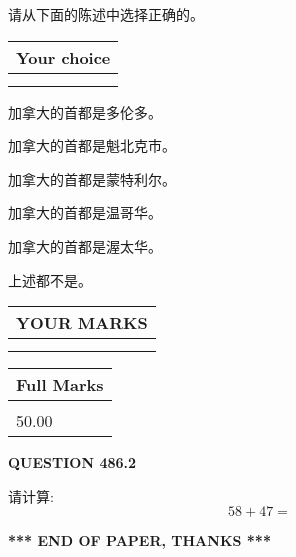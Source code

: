 \documentclass{ctexart}
\begin{document}
  
请从下面的陈述中选择正确的。
  
  
\noindent\hspace{3.0in} \begin{tabular}{|l|}
\hline
Your choice \\
\hline
 \\ 
 \\ 
\hline
\end{tabular}
  
  
 
 
加拿大的首都是多伦多。
 
 
加拿大的首都是魁北克市。
 
 
加拿大的首都是蒙特利尔。
 
 
加拿大的首都是温哥华。
 
 
加拿大的首都是渥太华。
 
 
 上述都不是。
 
 
  
\vspace{0.2in}
  
\noindent\begin{tabular}{|l|}
\hline
 YOUR MARKS  \\
\hline
 \\ 
 \\ 
\hline
\end{tabular}
\hspace{0.05in} \begin{tabular}{|l|}
\hline
 Full Marks  \\
\hline
 \\ 
50.00 \\
\hline
\end{tabular}
{\textbf{\Large{QUESTION
486.2 
}}}
  
  
 
请计算:
\begin{equation}
58 +  %
47 = \nonumber
\end{equation}
 

 

 
   
   
 \vspace{0.2in}
 
   
   
   
   
\vspace{1.0in} 
{\textbf{\large{ *** END OF PAPER, THANKS *** }}} 
   
\end{document}
